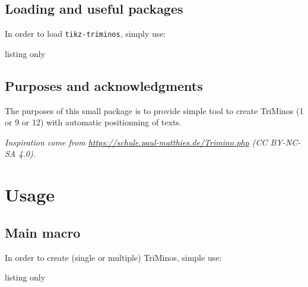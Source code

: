 \documentclass[11pt,a4paper]{ltxdoc}
\begin{document}
\subsection{Loading and useful packages}

In order to load \lstinline[language={[latex]TeX},basicstyle=\ttfamily]{tikz-triminos}, simply use:

\begin{DemoCode}{listing only}
\usepackage{tikz-triminos}               %
\usepackage[fa6]{tikz-triminos}          %
\usepackage[fa7]{tikz-triminos}          %
\usepackage[nonfa]{tikz-triminos}        %
\end{DemoCode}


\subsection{Purposes and acknowledgments}

The purposes of this small package is to provide simple tool to create \textsf{TriMinos} (1 or 9 or 12) with automatic positionning of texts.

\smallskip

\textit{Inspiration come from \url{https://schule.paul-matthies.de/Trimino.php} (CC BY-NC-SA 4.0)}.

\section{Usage}

\subsection{Main macro}

In order to create (single or multiple) \textsf{TriMinos}, simple use:

\begin{DemoCode}{listing only}
\end{DemoCode}
\end{document}

